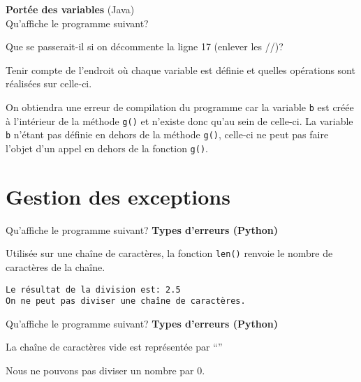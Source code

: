  \begin{Exercice}[10 minutes] \textbf{Portée des variables} (Java) \\
    Qu'affiche le programme suivant?
    
    Que se passerait-il si on décommente la ligne 17 (enlever les //)?

    \begin{conseil}
        Tenir compte de l’endroit où chaque variable est définie et quelles opérations sont réalisées sur celle-ci.
    \end{conseil}

    \begin{solution}
        On obtiendra une erreur de compilation du programme car la variable \lstinline{b} est créée à l’intérieur de la méthode \lstinline{g()} et n’existe donc qu’au sein de celle-ci. La variable \lstinline{b} n’étant pas définie en dehors de la méthode \lstinline{g()}, celle-ci ne peut pas faire l’objet d’un appel en dehors de la fonction \lstinline{g()}.
    \end{solution}
    

 \end{Exercice}

\section{Gestion des exceptions}

\begin{Exercice}[5 minutes] Qu'affiche le programme suivant? \textbf{Types d'erreurs (Python)}\\
      
     \begin{conseil}
        Utilisée sur une chaîne de caractères, la fonction \lstinline{len()} renvoie le nombre de caractères de la chaîne. 
    \end{conseil}
     \begin{solution}
        \lstinline{Le résultat de la division est: 2.5}\\
        \lstinline{On ne peut pas diviser une chaîne de caractères.}
     \end{solution}   
 \end{Exercice}

\begin{Exercice}[5 minutes] Qu'affiche le programme suivant? \textbf{Types d'erreurs (Python)}\\
    
    
     \begin{conseil}
         La chaîne de caractères vide est représentée par ``'' 
    \end{conseil}
     \begin{solution}
        Nous ne pouvons pas diviser un nombre par 0.
     \end{solution}   
 \end{Exercice}

